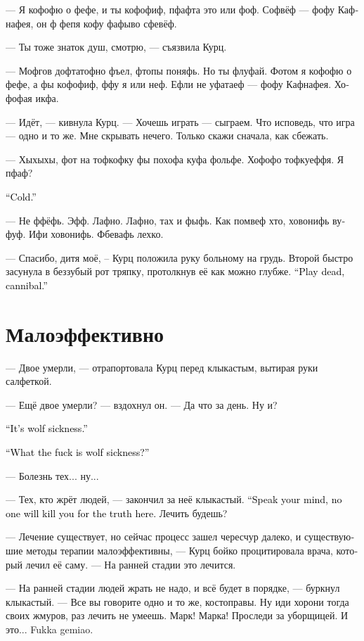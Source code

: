 \documentclass[a4paper,12pt,fleqn]{book}\usepackage{cooltooltips}\usepackage{polyglossia}\setdefaultlanguage[babelshorthands=true]{russian}\setotherlanguage{english}\defaultfontfeatures{Ligatures=TeX,Mapping=tex-text} \usepackage{xcolor}\definecolor{lightgray}{HTML}{bbbbbb}\color{lightgray}\newcommand{\ml}[3]{\textenglish{\textcolor{black}{#3}}}
\begin{document}
--- Я кофофю о фефе, и ты кофофиф, пфафта это или фоф.
Софвёф --- фофу Кафнафея, он ф фепя кофу фафыво сфевёф.

--- Ты тоже знаток душ, смотрю, --- съязвила Курц.

--- Мофгов дофтатофно фъел, фтопы поняфь.
Но ты флуфай.
Фотом я кофофю о фефе, а фы кофофиф, ффу я или неф.
Ефли не уфатаеф --- фофу Кафнафея.
Хофофая икфа.

--- Идёт, --- кивнула Курц.
--- Хочешь играть --- сыграем.
Что исповедь, что игра --- одно и то же.
Мне скрывать нечего.
Только скажи сначала, как сбежать.

--- Хыхыхы, фот на тофкофку фы похофа куфа фольфе.
Хофофо тофкуеффя.
Я пфаф?

\ml{$0$}
{--- Не угадал.}
{``Cold.''}

--- Не ффёфь.
Эфф.
Лафно.
Лафно, тах и фыфь.
Как помвеф хто, ховонифь вуфуф.
Ифи ховонифь.
Фбевафь лехко.

--- Спасибо, дитя моё, -- Курц положила руку больному на грудь.
Второй быстро засунула в беззубый рот тряпку, протолкнув её как можно глубже.
\ml{$0$}
{--- Сыграй с дьяволом, людоед.}
{``Play dead, cannibal.''}

\section{Малоэффективно}

--- Двое умерли, --- отрапортовала Курц перед клыкастым, вытирая руки салфеткой.

--- Ещё двое умерли? --- вздохнул он. --- Да что за день.
Ну и?

\ml{$0$}
{--- Это волчья болезнь.}
{``It's wolf sickness.''}

\ml{$0$}
{--- Что ещё за волчья болезнь?}
{``What the fuck is wolf sickness?''}

--- Болезнь тех... ну...

--- Тех, кто жрёт людей, --- закончил за неё клыкастый.
\ml{$0$}
{--- Говори прямо, за правду здесь тебя никто не убьёт.}
{``Speak your mind, no one will kill you for the truth here.}
Лечить будешь?

--- Лечение существует, но сейчас процесс зашел чересчур далеко, и существуюшие методы терапии малоэффективны, --- Курц бойко процитировала врача, который лечил её саму.
--- На ранней стадии это лечится.

--- На ранней стадии людей жрать не надо, и всё будет в порядке, --- буркнул клыкастый.
--- Все вы говорите одно и то же, костоправы.
Ну иди хорони тогда своих жмуров, раз лечить не умеешь.
Марк!
Марка!
Проследи за уборщицей.
И это... Fukka gemiao.
\end{document}
